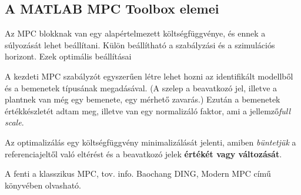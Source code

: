 \subsection{A MATLAB MPC Toolbox elemei}
Az MPC blokknak van egy alapértelmezett költségfüggvénye, és ennek a súlyozását lehet beállítani.
Külön beállítható a szabályzási és a szimulációs horizont.
Ezek optimális beállításai 

A kezdeti MPC szabályzót egyszerűen létre lehet hozni az identifikált modellből és a bemenetek típusának megadásával. (A szelep a beavatkozó jel, illetve a plantnek van még egy bemenete, egy mérhető zavarás.) Ezután a bemenetek értékkészletét adtam meg, illetve van egy normalizáló faktor, ami a jellemző\textit{full scale}.

Az optimalizálás egy költségfüggvény minimalizálását jelenti, amiben \textit{büntetjük} a referenciajeltől való eltérést és a beavatkozó jelek \textbf{értékét vagy változását}.

A fenti a klasszikus MPC, tov. info. Baochang DING, Modern MPC című könyvében olvasható.


